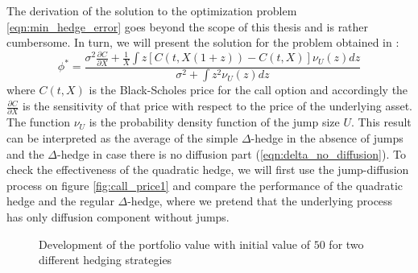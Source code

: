 \documentclass[times, utf8, diplomski]{fer}
\begin{document}
\noindent The derivation of the solution to the optimization problem \ref{eqn:min_hedge_error} goes beyond the scope of this thesis and is rather cumbersome. In turn, we will present the solution for the problem obtained in \cite{cont_financial_2004}:
\begin{equation} \label{eqn:quadratic_hedge}
	\phi^* = \frac{\sigma^2 \frac{\partial C}{\partial X} + \frac{1}{X} \int z[C(t,X(1+z))-C(t,X)] \nu_U(z)dz}{\sigma^2 + \int z^2 \nu_U(z)dz}
\end{equation} where $C(t,X)$ is the Black-Scholes price for the call option and accordingly the $\frac{\partial C}{\partial X}$ is the sensitivity of that price with respect to the price of the underlying asset. The function $\nu_U$ is the probability density function of the jump size $U$. This result can be interpreted as the average of the simple $\Delta$-hedge in the absence of jumps and the $\Delta$-hedge in case there is no diffusion part (\ref{eqn:delta_no_diffusion}). To check the effectiveness of the quadratic hedge, we will first use the jump-diffusion process on figure \ref{fig:call_price1} and compare the performance of the quadratic hedge and the regular $\Delta$-hedge, where we pretend that the underlying process has only diffusion component without jumps. 

\begin{figure}[ht]
\centering

\caption{Development of the portfolio value with initial value of $50$ for two different hedging strategies}
\label{fig:hedging_jump_diffusion}	
\end{figure}
\end{document}
